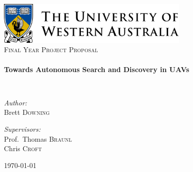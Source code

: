 
\begin{titlepage}
\begin{center}

\includegraphics[width=0.7\textwidth]{./logo.png}~\\[1cm]

\textsc{\Large Final Year Project Proposal}\\[0.5cm]

\HRule \\[0.4cm]
{ \huge \bfseries Towards Autonomous Search and Discovery in UAVs \\[0.4cm] }

\HRule \\[1.5cm]

\noindent
\begin{minipage}[t]{0.4\textwidth}
\begin{flushleft} \large
\emph{Author:}\\
Brett \textsc{Downing}
\end{flushleft}
\end{minipage}%
\begin{minipage}[t]{0.4\textwidth}
\begin{flushright} \large
\emph{Supervisors:} \\
Prof.~Thomas \textsc{Braunl}\\
Chris \textsc{Croft}
\end{flushright}
\end{minipage}

\vfill

{\large \today}

\end{center}
\end{titlepage}